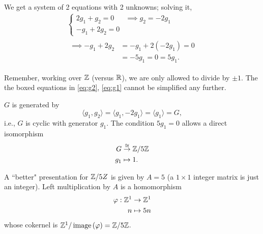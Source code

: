 \documentclass[../algebraNotesMSRI-UP2016.tex]{subfiles}
\begin{document}
\begin{frame}[c]
We get a system of 2 equations with 2 unknowns; solving it, 
\begin{align}
\left\{\begin{array}{rl}\label{eq:g2}
	2g_1+g_2=0 & \implies \boxed{g_2=-2g_1} \\
	-g_1+2g_2= 0 &
	\end{array}\right. \\
\begin{aligned}\label{eq:g1}
	\implies -g_1+2g_2 &= -g_1+2(-2g_1) = 0	\\
		&= -5g_1=\boxed{0=5g_1}. 	
	\end{aligned}
\end{align}
\end{frame}

\begin{frame}[c]{}{}
Remember, working over $\mathbb Z$ (versus $\mathbb R$), we are only allowed to divide by $\pm 1$.  The the boxed equations in \eqref{eq:g2}, \eqref{eq:g1} cannot be simplified any further.  

\smallGap
$G$ is generated by  
\[
\langle g_1,g_2\rangle = \langle g_1,-2g_1\rangle = \langle g_1\rangle = G,
\]
i.e., $G$ is cyclic with generator $g_1$.  The condition $5g_1=0$ allows a direct isomorphism
\begin{align*}
G &\overset{\cong}{\to} \mathbb Z/5\mathbb Z \\
g_1 &\mapsto 1.
\end{align*}
\end{frame}

\begin{frame}[c] 
\begin{ex}
A ``better" presentation for $\mathbb Z/5Z$ is given by $A=5$ (a $1\times 1$ integer matrix is just an integer).  Left multiplication by $A$ is a homomorphism  
\begin{align*}
\varphi: \mathbb Z^1 &\to \mathbb Z^1 \\
 n &\mapsto 5n
\end{align*}  
whose cokernel is $\mathbb Z^1/\operatorname{image}{(\varphi)}=\mathbb Z/5\mathbb Z$.
\end{ex}
\end{frame}

\end{document}
